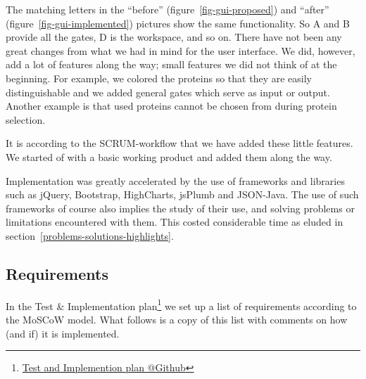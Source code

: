 \documentclass[a4paper]{article}
\makeatletter
\newcommand{\urlTestImplementation}{https://github.com/FelixAkk/synthbio/raw/master/deliverables/test-implementation/test-implementation.pdf}
\newcommand{\hrefTestImplementation}{\href{\urlTestImplementation}{Test and Implemention plan @Github}}
\makeatother
\begin{document}
The matching letters in the ``before'' (figure~\ref{fig-gui-proposed}) and ``after'' (figure~\ref{fig-gui-implemented}) pictures show the same functionality. So A and B provide all the gates, D is the workspace, and so on. There have not been any great changes from what we had in mind for the user interface. We did, however, add a lot of features along the way; small features we did not think of at the beginning. For example, we colored the proteins so that they are easily distinguishable and we added general gates which serve as input or output. Another example is that used proteins cannot be chosen from during protein selection.

It is according to the SCRUM-workflow that we have added these little features. We started of with a basic working product and added them along the way.

Implementation was greatly accelerated by the use of frameworks and libraries such as jQuery, Bootstrap, HighCharts, jsPlumb and JSON-Java. The use of such frameworks of course also implies the study of their use, and solving problems or limitations encountered with them. This costed considerable time as eluded in section~\ref{problems-solutions-highlights}.

\newpage
\subsection{Requirements}
\label{process-requirements}
In the Test \& Implementation plan\footnote{\hrefTestImplementation} we set up a list of requirements according to the MoSCoW model. What follows is a copy of this list with comments on how (and if) it is implemented.
\end{document}
